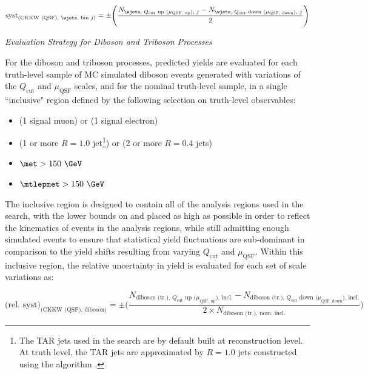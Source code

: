 \begin{equation}
\label{eq:ckkw_wjets}
\text{syst}_\text{(CKKW (QSF), \wjets, bin \(j\))} = \pm\Bigg(\frac{N_\text{\wjets, \(Q_\text{cut}\) up (\(\mu_\text{QSF, up}\)), \(j\)} - N_\text{\wjets, \(Q_\text{cut}\) down (\(\mu_\text{QSF, down}\)), \(j\)} }{2}\Bigg)
\end{equation}

\vspace{1em}
\noindent\textit{Evaluation Strategy for Diboson and Triboson Processes}
\vspace{1em}

For the diboson and triboson processes, predicted yields are evaluated for each truth-level sample of MC simulated diboson events generated with variations of the \(Q_\text{cut}\) and \(\mu_\text{QSF}\) scales, and for the nominal truth-level sample, in a single ``inclusive" region defined by the following selection on truth-level observables:

\begin{itemize}
\item (1 signal muon) or (1 signal electron)
\item (1 or more \(R=1.0\) \largeR jet\footnote{The TAR jets used in the search are by default built at reconstruction level. At truth level, the TAR jets are approximated by \(R=1.0\) jets constructed using the \akt algorithm \cite{akt_algo}.}) or (2 or more \(R=0.4\) jets)
\item \(\met > 150~\GeV\)
\item \(\mtlepmet > 150~\GeV\)
\end{itemize}

The inclusive region is designed to contain all of the analysis regions used in the search, with the lower bounds on \met and \mtlepmet placed as high as possible in order to reflect the kinematics of events in the analysis regions, while still admitting enough simulated events to ensure that statistical yield fluctuations are sub-dominant in comparison to the yield shifts resulting from varying \(Q_\text{cut}\) and \(\mu_\text{QSF}\). Within this inclusive region, the relative uncertainty in yield is evaluated for each set of scale variations as:

\begin{footnotesize}
\begin{equation}
\label{eq:ckkw_wjets}
\text{(rel. syst)}_\text{(CKKW (QSF), diboson)} = \pm\Bigg(\frac{N_\text{diboson (tr.), \(Q_\text{cut}\) up (\(\mu_\text{QSF, up}\)), incl.} - N_\text{diboson (tr.), \(Q_\text{cut}\) down (\(\mu_\text{QSF, down}\)), incl.} }{2\times N_\text{diboson (tr.), nom, incl.}}\Bigg)
\end{equation}
\end{footnotesize}

